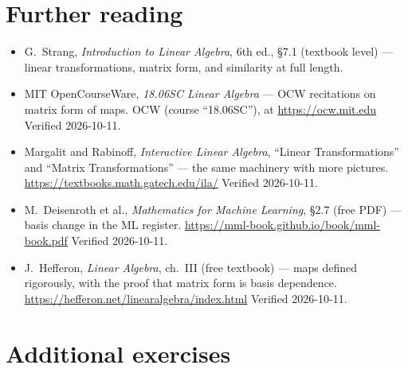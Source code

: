 \section*{Further reading}

\begin{itemize}
\item G.~Strang, \emph{Introduction to Linear Algebra}, 6th ed., \S7.1
(textbook level) --- linear transformations, matrix form, and
similarity at full length.
\item MIT OpenCourseWare, \emph{18.06SC Linear Algebra} --- OCW
recitations on matrix form of maps. \newline
OCW (course ``18.06SC''), at \url{https://ocw.mit.edu}
Verified 2026-10-11.
\item Margalit and Rabinoff, \emph{Interactive Linear Algebra},
``Linear Transformations'' and ``Matrix Transformations'' --- the same
machinery with more pictures. \newline
\url{https://textbooks.math.gatech.edu/ila/}
Verified 2026-10-11.
\item M.~Deisenroth et al., \emph{Mathematics for Machine Learning},
\S2.7 (free PDF) --- basis change in the ML register.\newline
\url{https://mml-book.github.io/book/mml-book.pdf}
Verified 2026-10-11.
\item J.~Hefferon, \emph{Linear Algebra}, ch.~III (free textbook) ---
maps defined rigorously, with the proof that matrix form is basis
dependence. \newline
\url{https://hefferon.net/linearalgebra/index.html}
Verified 2026-10-11.
\end{itemize}

\section*{Additional exercises}

